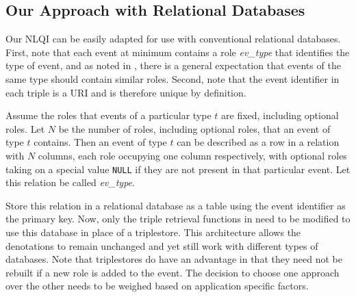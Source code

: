 \documentclass[../main.tex]{subfiles}
\begin{document}
\begin{refsection}
\section{Our Approach with Relational Databases}
\label{webist2019journal:relationaldb}

Our NLQI can be easily adapted for use with conventional relational databases.  First, note that each event at minimum contains a role \textit{ev\_type} that identifies the type of event, and as noted in , there is a general expectation that events of the same type should contain similar roles.  Second, note that the event identifier in each triple is a URI and is therefore unique by definition.

Assume the roles that events of a particular type $t$ are fixed, including optional roles.  Let $N$ be the number of roles, including optional roles, that an event of type $t$ contains.  Then an event of type $t$ can be described as a row in a relation with $N$ columns, each role occupying one column respectively, with optional roles taking on a special value \texttt{NULL} if they are not present in that particular event. Let this relation be called \textit{ev\_type}.

Store this relation in a relational database as a table using the event identifier as the primary key.  Now, only the triple retrieval functions in  need to be modified to use this database in place of a triplestore. This architecture allows the denotations to remain unchanged and yet still work with different types of databases. Note that triplestores do have an advantage in that they need not be rebuilt if a new role is added to the event. The decision to choose one approach over the other needs to be weighed based on application specific factors.


\end{refsection}
\end{document}
